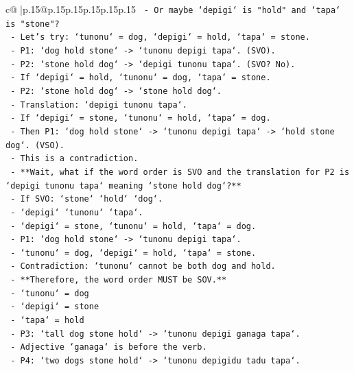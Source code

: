 \documentclass{article}
\begin{document}
{\begin{supertabular}{c@{$\;$}|p{.15\linewidth}@{}p{.15\linewidth}p{.15\linewidth}p{.15\linewidth}p{.15\linewidth}p{.15\linewidth}}
{{{\texttt{       {-} Or maybe `depigi` is "hold" and `tapa` is "stone"?} \\
\texttt{         {-} Let's try: `tunonu` = dog, `depigi` = hold, `tapa` = stone.} \\
\texttt{         {-} P1: `dog hold stone` {-}> `tunonu depigi tapa`. (SVO).} \\
\texttt{         {-} P2: `stone hold dog` {-}> `depigi tunonu tapa`. (SVO? No).} \\
\texttt{         {-} If `depigi` = hold, `tunonu` = dog, `tapa` = stone.} \\
\texttt{         {-} P2: `stone hold dog` {-}> `stone hold dog`.} \\
\texttt{         {-} Translation: `depigi tunonu tapa`.} \\
\texttt{         {-} If `depigi` = stone, `tunonu` = hold, `tapa` = dog.} \\
\texttt{         {-} Then P1: `dog hold stone` {-}> `tunonu depigi tapa` {-}> `hold stone dog`. (VSO).} \\
\texttt{         {-} This is a contradiction.} \\
\texttt{     {-} **Wait, what if the word order is SVO and the translation for P2 is `depigi tunonu tapa` meaning `stone hold dog`?**} \\
\texttt{       {-} If SVO: `stone` `hold` `dog`.} \\
\texttt{       {-} `depigi` `tunonu` `tapa`.} \\
\texttt{       {-} `depigi` = stone, `tunonu` = hold, `tapa` = dog.} \\
\texttt{       {-} P1: `dog hold stone` {-}> `tunonu depigi tapa`.} \\
\texttt{       {-} `tunonu` = dog, `depigi` = hold, `tapa` = stone.} \\
\texttt{       {-} Contradiction: `tunonu` cannot be both dog and hold.} \\
\texttt{     {-} **Therefore, the word order MUST be SOV.**} \\
\texttt{       {-} `tunonu` = dog} \\
\texttt{       {-} `depigi` = stone} \\
\texttt{       {-} `tapa` = hold} \\
\texttt{       {-} P3: `tall dog stone hold` {-}> `tunonu depigi ganaga tapa`.} \\
\texttt{         {-} Adjective `ganaga` is before the verb.} \\
\texttt{       {-} P4: `two dogs stone hold` {-}> `tunonu depigidu tadu tapa`.} \\
}}}
\end{supertabular}}
\end{document}
